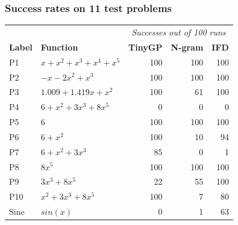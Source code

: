 \documentclass{beamer}
\newcommand{\tableemph}[1]{{#1}}
\newcommand{\tablewin}[1]{\tableemph{#1}}
\newcommand{\tablemid}[1]{\tableemph{#1}}
\newcommand{\tablelose}[1]{\tableemph{#1}}
\newcommand{\tabletie}[1]{\color{MyLightGray} {#1}}
\begin{document}
\begin{frame}
  \frametitle{Success rates on 11 test problems}
  
\begin{center}
\begin{tabular}{llrrr}
	& & \multicolumn{3}{c}{\emph{Successes out of 100 runs}} \\
	\textbf{Label} & \textbf{Function} & \textbf{TinyGP} & \textbf{N-gram} & \textbf{IFD} \\ \hline
	\tabletie{P1} & \tabletie{$x + x^2 + x^3 + x^4 + x^5$} & \tabletie{100} & \tabletie{100} & \tabletie{100} \\
	\tabletie{P2} & \tabletie{$-x-2x^2+x^3$} & \tabletie{100} & \tabletie{100} & \tabletie{100} \\
	P3 & $1.009 + 1.419x + x^2$ & \tablewin{100} & \tablelose{61} & \tablewin{100} \\
	\tabletie{P4} & \tabletie{$6+x^2+3x^3+8x^5$} & \tabletie{0} & \tabletie{0} & \tabletie{0} \\ \hline
	\tabletie{P5} & \tabletie{$6$} & \tabletie{100} & \tabletie{100} & \tabletie{100} \\ %
	P6 & $6+x^2$ & \tablewin{100} & \tablelose{10} & \tablewin{94} \\ %
	P7 & $6 + x^2 + 3 x^3$ & \tablewin{85} & \tablelose{0} & \tablelose{1} \\ \hline %
	\tabletie{P8} & \tabletie{$8x^5$} & \tabletie{100} & \tabletie{100} & \tabletie{100} \\ %
	P9 & $3x^3+8x^5$ & \tablelose{22} & \tablemid{55} & \tablewin{100} \\ %
	P10 & $x^2+3x^3+8x^5$ & \tablewin{100} & \tablelose{7} & \tablemid{80} \\ \hline %
	Sine & $sin(x)$ & \tablelose{0} & \tablelose{1} & \tablewin{63} \\ \hline
\end{tabular}
\end{center}
\end{frame}
\end{document}
